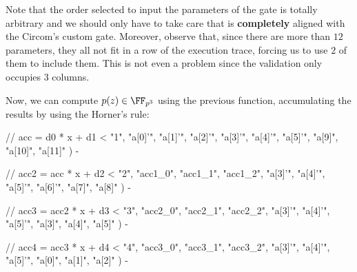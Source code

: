Note that the order selected to input the parameters of the \EVPOL gate is totally arbitrary and we should only have to take care that is \textbf{completely} aligned with the Circom's custom gate. Moreover, observe that, since there are more than $12$ parameters, they all not fit in a row of the execution trace, forcing us to use $2$ of them to include them. This is not even a problem since the validation only occupies $3$ columns. 


Now, we can compute $p(z) \in \FF_{p^3}$ using the previous function, accumulating the results by using the Horner's rule:

\begin{js}
// acc = d0 * x + d1 
<%
        "1", 
        "a[0]'", 
        "a[1]'", 
        "a[2]'", 
        "a[3]'", 
        "a[4]'", 
        "a[5]'", 
        "a[9]", 
        "a[10]", 
        "a[11]"
    ) 
-%
\end{js}

\begin{js}
// acc2 = acc * x + d2 
<%
        "2",
        "acc1_0", 
        "acc1_1", 
        "acc1_2", 
        "a[3]'", 
        "a[4]'", 
        "a[5]'", 
        "a[6]'", 
        "a[7]", 
        "a[8]"
    ) 
-%
\end{js}

\begin{js}
// acc3 = acc2 * x + d3 
<%
        "3", 
        "acc2_0", 
        "acc2_1", 
        "acc2_2", 
        "a[3]'", 
        "a[4]'", 
        "a[5]'", 
        "a[3]", 
        "a[4]", 
        "a[5]"
    ) 
-%
\end{js}

\begin{js}
// acc4 = acc3 * x + d4 
<%
        "4", 
        "acc3_0", 
        "acc3_1", 
        "acc3_2", 
        "a[3]'", 
        "a[4]'", 
        "a[5]'", 
        "a[0]", 
        "a[1]", 
        "a[2]"
    ) 
-%
\end{js}

